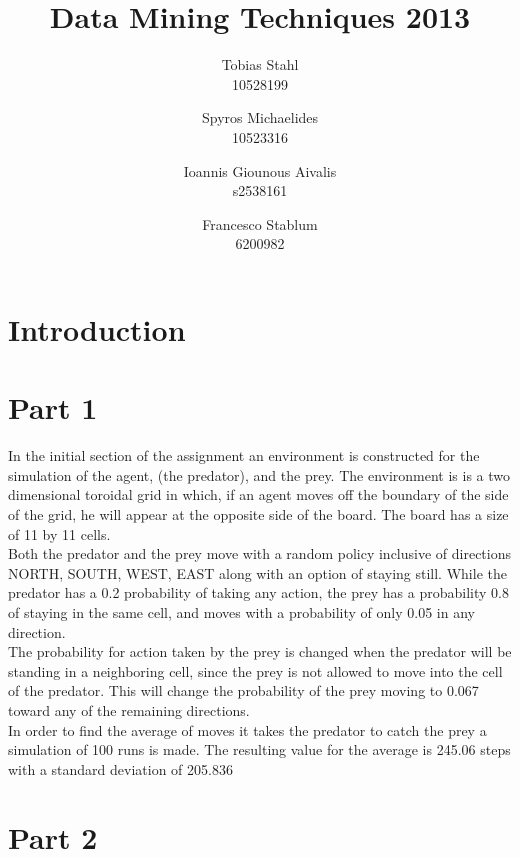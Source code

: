 \documentclass[11pt]{article}
\title{
	\textbf{Data Mining Techniques 2013}
}
\author{Tobias Stahl \\ 10528199 \and Spyros Michaelides \\ 10523316 \and Ioannis Giounous Aivalis \\ s2538161 \and Francesco Stablum \\ 6200982}
\date{}
\begin{document}
\maketitle

\section{Introduction}



\section{Part 1}

In the initial section of the assignment an environment is constructed for the simulation of the agent, (the predator), and the prey. The environment is is a two dimensional toroidal grid in which, if an agent moves off the boundary of the side of the grid, he will appear at the opposite side of the board. The board has a size of 11 by 11 cells.\\
Both the predator and the prey move with a random policy inclusive of directions NORTH, SOUTH, WEST, EAST along with an option of staying still. While the predator has a 0.2 probability of taking any action, the prey has a probability 0.8 of staying in the same cell, and moves with a probability of only 0.05 in any direction.\\
The probability for action taken by the prey is changed when the predator will be standing in a neighboring cell, since the prey is not allowed to move into the cell of the predator. This will change the probability of the prey moving to 0.067 toward any of the remaining directions.\\
In order to find the average of moves it takes the predator to catch the prey a simulation of 100 runs is made. The resulting value for the average is 245.06 steps with a standard deviation of 205.836



\section{Part 2}
\end{document}

